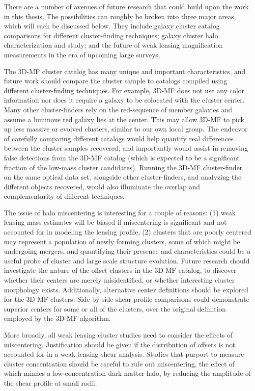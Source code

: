 There are a number of avenues of future research that could build upon the work in this thesis. The possibilities can roughly be broken into three major areas, which will each be discussed below. They include galaxy cluster catalog comparisons for different cluster-finding techniques; galaxy cluster halo characterization and study; and the future of weak lensing magnification measurements in the era of upcoming large surveys.

The \ac{3D-MF} cluster catalog has many unique and important characteristics, and future work should compare the cluster sample to catalogs compiled using different cluster-finding techniques. For example, \ac{3D-MF} does not use any color information nor does it require a galaxy to be colocated with the cluster center. Many other cluster-finders rely on the red-sequence of member galaxies and assume a luminous red galaxy lies at the center. This may allow \ac{3D-MF} to pick up less massive or evolved clusters, similar to our own local group. The endeavor of carefully comparing different catalogs would help quantify real differences between the cluster samples recovered, and importantly would assist in removing false detections from the \ac{3D-MF} catalog (which is expected to be a significant fraction of the low-mass cluster candidates). Running the \ac{3D-MF} cluster-finder on the same optical data set, alongside other cluster-finders, and analyzing the different objects recovered, would also illuminate the overlap and complementarity of different techniques.

The issue of halo miscentering is interesting for a couple of reasons: (1) weak lensing mass estimates will be biased if miscentering is significant and not accounted for in modeling the lensing profile, (2) clusters that are poorly centered may represent a population of newly forming clusters, some of which might be undergoing mergers, and quantifying their presence and characteristics could be a useful probe of cluster and large scale structure evolution. Future research should investigate the nature of the offset clusters in the \ac{3D-MF} catalog, to discover whether their centers are merely misidentified, or whether interesting cluster morphology exists. Additionally, alternative center definitions should be explored for the \ac{3D-MF} clusters. Side-by-side shear profile comparisons could demonstrate superior centers for some or all of the clusters, over the original definition employed by the \ac{3D-MF} algorithm.

More broadly, all weak lensing cluster studies need to consider the effects of miscentering. Justification should be given if the distribution of offsets is not accounted for in a weak lensing shear analysis. Studies that purport to measure cluster concentration should be careful to rule out miscentering, the effect of which mimics a low-concentration dark matter halo, by reducing the amplitude of the shear profile at small radii. 

